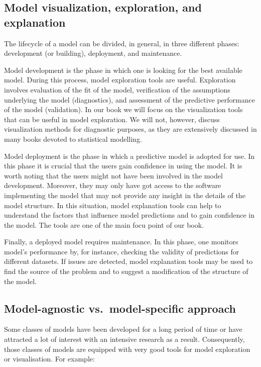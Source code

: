 \documentclass[]{krantz}
\theoremstyle{definition}
\theoremstyle{definition}
\theoremstyle{definition}
\theoremstyle{remark}
\begin{document}
\hypertarget{model-visualization-exploration-and-explanation}{%
\subsection{Model visualization, exploration, and
explanation}\label{model-visualization-exploration-and-explanation}}

The lifecycle of a model can be divided, in general, in three different
phases: development (or building), deployment, and maintenance.

Model development is the phase in which one is looking for the best
available model. During this process, model exploration tools are
useful. Exploration involves evaluation of the fit of the model,
verification of the assumptions underlying the model (diagnostics), and
assessment of the predictive performance of the model (validation). In
our book we will focus on the visualization tools that can be useful in
model exploration. We will not, however, discuss visualization methods
for diagnostic purposes, as they are extensively discussed in many books
devoted to statistical modelling.

Model deployment is the phase in which a predictive model is adopted for
use. In this phase it is crucial that the users gain confidence in using
the model. It is worth noting that the users might not have been
involved in the model development. Moreover, they may only have got
access to the software implementing the model that may not provide any
insight in the details of the model structure. In this situation, model
explanation tools can help to understand the factors that influence
model predictions and to gain confidence in the model. The tools are one
of the main focu point of our book.

Finally, a deployed model requires maintenance. In this phase, one
monitors model's performance by, for instance, checking the validity of
predictions for different datasets. If issues are detected, model
explanation tools may be used to find the source of the problem and to
suggest a modification of the structure of the model.

\hypertarget{model-agnostic-vs.model-specific-approach}{%
\subsection{Model-agnostic vs.~model-specific
approach}\label{model-agnostic-vs.model-specific-approach}}

Some classes of models have been developed for a long period of time or
have attracted a lot of interest with an intensive research as a result.
Consequently, those classes of models are equipped with very good tools
for model exploration or visualisation. For example:
\end{document}

